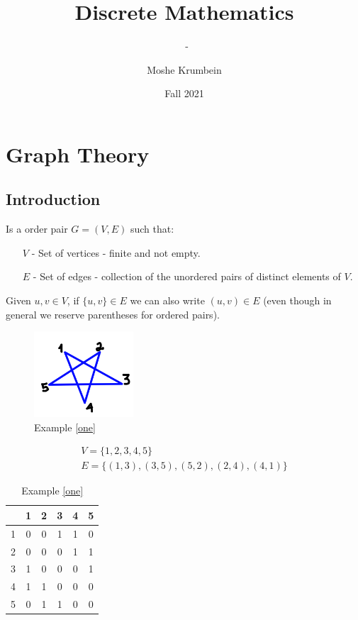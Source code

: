 \documentclass[00_complete]{subfiles}
\title{Discrete Mathematics}
\author{Moshe Krumbein}
\date{Fall 2021}
\begin{document}
\setcounter{chapter}{10}

\chapter{Graph Theory}
\subtitle{\theauthor~- \thedate}

\section{Introduction}
\begin{definition}
    Is a order pair $G=(V,E)$ such that:
    \begin{enumerate}
        \item[$V$ -] Set of vertices - finite and not empty.
        \item[$E$ -] Set of edges - collection of the unordered pairs of
            distinct elements of $V$.
    \end{enumerate}
    Given $u,v \in V$, if $\{u,v\} \in E$ we can also write $(u,v) \in E$ (even
    though in general we reserve parentheses for ordered pairs).
\end{definition}
\begin{example}
    \label{one}
    \begin{figure}[ht]
        \centering
        \includegraphics[width=0.33\textwidth]{w11_1}
        \caption{Example \ref{one}}
    \end{figure}
    \begin{gather*}
        V= \{1,2,3,4,5\} \\
        E=\{(1,3),(3,5),(5,2),(2,4),(4,1)\}
    \end{gather*}
    \begin{table}[ht!]
    \centering
    {\renewcommand{\arraystretch}{1.2}%
    \begin{tabular}{c|ccccc}
    & 1 & 2 & 3 & 4 & 5 \\
    \hline
        1 &0&0&1&1&0 \\
        2 &0&0&0&1&1 \\
        3 &1&0&0&0&1 \\
        4 &1&1&0&0&0 \\
        5 &0&1&1&0&0 \\
\end{tabular}}
\caption{Example \ref{one}}
\end{table}
\end{example}
\end{document}
